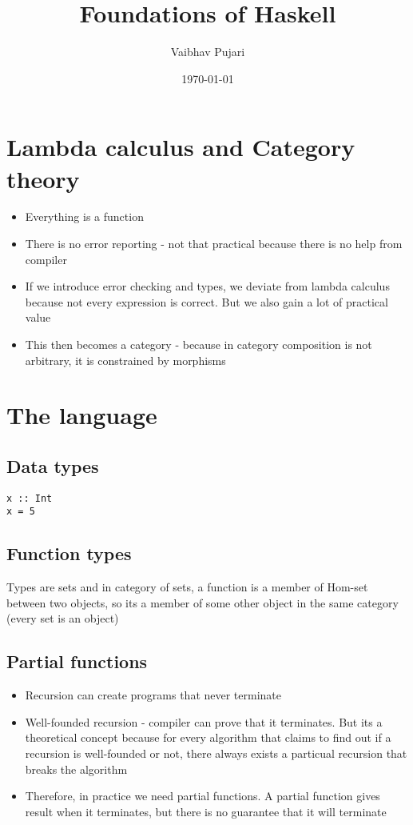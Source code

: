 \documentclass[11pt]{article}
\author{Vaibhav Pujari}
\date{\today}
\title{Foundations of Haskell}
\begin{document}
\maketitle
\tableofcontents


\section{Lambda calculus and Category theory}
\label{sec:org3dd5759}
\begin{itemize}
\item Everything is a function
\item There is no error reporting - not that practical because there is no help from compiler
\item If we introduce error checking and types, we deviate from lambda calculus because not every expression is correct. But we also gain a lot of practical value
\item This then becomes a category - because in category composition is not arbitrary, it is constrained by morphisms
\end{itemize}
\section{The language}
\label{sec:org5892609}
\subsection{Data types}
\label{sec:org305db3e}
\begin{verbatim}
x :: Int
x = 5
\end{verbatim}
\subsection{Function types}
\label{sec:org3b97478}
Types are sets and in category of sets, a function is a member of Hom-set between two objects, so its a member of some other object in the same category (every set is an object)
\subsection{Partial functions}
\label{sec:org816f474}
\begin{itemize}
\item Recursion can create programs that never terminate
\item Well-founded recursion - compiler can prove that it terminates. But its a theoretical concept because for every algorithm that claims to find out if a recursion is well-founded or not, there always exists a particual recursion that breaks the algorithm
\item Therefore, in practice we need partial functions. A partial function gives result when it terminates, but there is no guarantee that it will terminate
\end{itemize}
\end{document}
